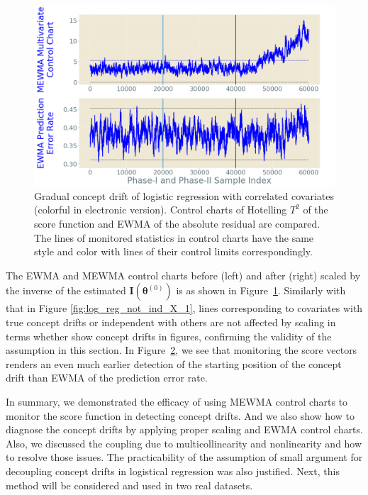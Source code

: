 \documentclass[twoside,11pt]{article}
\begin{document}
\begin{enumerate}[(I)]
\begin{figure}[!htbp]
  \label{fig:log_reg_not_ind_X_grad_cd}
\end{figure}
\begin{figure}[!htbp]
\centering
\includegraphics[width = 0.6\linewidth]{../figures/v14/sim_7/logi_small/1_sim7_logi_1e-08_0_005_1.png}
  \caption{Gradual concept drift of logistic regression with correlated covariates (colorful in electronic version). Control charts of Hotelling $T^2$ of the score function and EWMA of the absolute residual are compared. The lines of monitored statistics in control charts have the same style and color with lines of their control limits correspondingly.}
  \label{fig:log_reg_ind_X_grad_cd_comp}
\end{figure}

The EWMA and MEWMA control charts before (left) and after (right) scaled by {the inverse of the estimated} ${\mathbf {I}}(\bm { \theta}^{(0)})$ is as shown in Figure~\ref{fig:log_reg_not_ind_X_grad_cd}. Similarly with that in Figure \ref{fig:log_reg_not_ind_X_1}, lines corresponding to covariates with true concept drifts or independent with others are not affected by scaling in terms whether show concept drifts in figures, confirming the validity of the assumption in this section. In Figure~\ref{fig:log_reg_ind_X_grad_cd_comp}, we see that monitoring the score vectors renders an even much earlier detection of the starting position of the concept drift than EWMA of the prediction error rate.

In summary, we demonstrated the efficacy of using MEWMA control charts to monitor the score function in detecting concept drifts. And we also show how to diagnose the concept drifts by applying proper scaling and EWMA control charts. Also, we discussed the coupling due to multicollinearity and nonlinearity and how to resolve those issues. The practicability of the assumption of small argument for decoupling concept drifts in logistical regression was also justified. Next, this method will be considered and used in two real datasets.
\end{enumerate}
\end{document}
